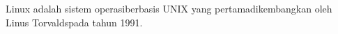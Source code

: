 \documentclass[preview]{standalone}
\begin{document}
\begin{center}
Linux adalah sistem operasiberbasis UNIX yang pertamadikembangkan oleh Linus Torvaldspada tahun 1991.
\end{center}
\end{document}
